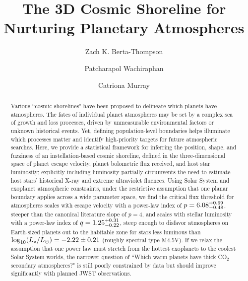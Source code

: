 \documentclass[modern,linenumbers,trackchanges]{aastex7}
\begin{document}
\title{The 3D Cosmic Shoreline for Nurturing Planetary Atmospheres}



\author[orcid=0000-0002-3321-4924]{Zach K. Berta-Thompson}


\author[orcid=0000-0001-6484-7559]{Patcharapol Wachiraphan}



\author[orcid=0000-0001-8504-5862]{Catriona Murray}







\begin{abstract}

Various ``cosmic shorelines" have been proposed to delineate which planets have atmospheres. The fates of individual planet atmospheres may be set by a complex sea of growth and loss processes, driven by unmeasurable environmental factors or unknown historical events. Yet, defining population-level boundaries helps illuminate which processes matter and identify high-priority targets for future atmospheric searches. Here, we provide a statistical framework for inferring the position, shape, and fuzziness of an instellation-based cosmic shoreline, defined in the three-dimensional space of planet escape velocity, planet bolometric flux received, and host star luminosity; explicitly including luminosity partially circumvents the need to estimate host stars' historical X-ray and extreme ultraviolet fluences. Using Solar System and exoplanet atmospheric constraints, under the restrictive assumption that one planar boundary applies across a wide parameter space, we find the critical flux threshold for atmospheres scales with escape velocity with a power-law index of $p=6.08_{-0.48}^{+0.69}$, steeper than the canonical literature slope of $p=4$, and scales with stellar luminosity with a power-law index of $q=1.25_{-0.22}^{+0.31}$, steep enough to disfavor atmospheres on Earth-sized planets out to the habitable zone for stars less luminous than $\log_{10} (L_\star/L_\odot) = -2.22 \pm 0.21$ (roughly spectral type M4.5V). If we relax the assumption that one power law must stretch from the hottest exoplanets to the coolest Solar System worlds, the narrower question of ``Which warm planets have thick CO$_2$ secondary atmospheres?" is still poorly constrained by data but should improve significantly with planned JWST observations. 

\end{abstract}
\end{document}
